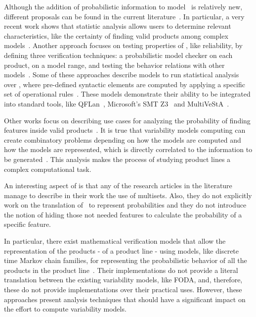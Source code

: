 Although the addition of probabilistic information to model \SPLs\ is relatively new, different proposals can be found in the current literature~\cite{chssgl13,tllv15,tlll15,dpcslsh17}. In particular, a very recent
work shows that statistic analysis allows users to determine relevant characteristics, like the certainty of finding valid products among complex models~\cite{dpcslsh17}.
%
Another approach focuses on testing properties of \SPLs, like reliability, by defining three verification techniques: a probabilistic model checker on each product, on a model range, and testing the behavior relations with other models~\cite{chssgl13}.
%
Some of these approaches describe models to run statistical analysis over \SPLs, where pre-defined syntactic elements are computed by applying a specific set of operational rules~\cite{tllv15,tlll15}. These models demonstrate their ability to be integrated into standard tools, like QFLan~\cite{tlll15}, Microsoft's SMT Z3~\cite{ln08} and MultiVeStA~\cite{sa13}.
%
%

Other works focus on describing use cases for analyzing the probability of finding features inside valid products~\cite{dpcslsh17}.
It is true that variability models computing can create combinatory problems
depending on how the models are computed and how the models are represented, which is directly
correlated to the information to be generated~\cite{dpcslsh17}.
This analysis makes the process of studying product lines a complex computational  task.

An interesting aspect of \fodaPAp is that
any of the research articles in the literature manage
to describe in their work the use of multisets.
Also, they do not explicitly work on
the translation of \FODA\ to represent probabilities and they do
not introduce the notion of hiding those not needed features to
calculate the probability of a specific feature.

In particular, there exist mathematical verification models that
allow the representation of the products - of a product line - using models,
like discrete time Markov chain families, for representing the probabilistic behavior of all
the products in the product line~\cite{vk13}. Their implementations do not
provide a literal translation between the existing variability models, like FODA,
and, therefore, these do not provide implementations over their practical uses.
However, these approaches present analysis techniques that should have
a significant impact on the effort to compute variability models.

